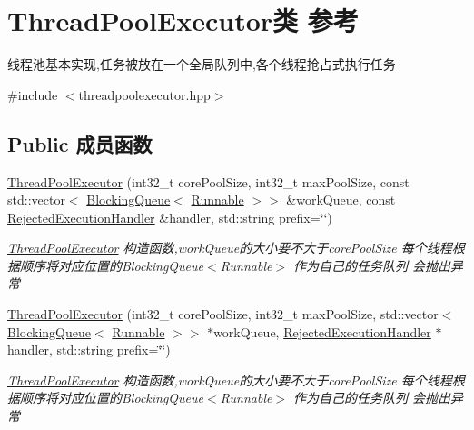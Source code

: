 \hypertarget{classThreadPoolExecutor}{}\section{Thread\+Pool\+Executor类 参考}
\label{classThreadPoolExecutor}


线程池基本实现,任务被放在一个全局队列中,各个线程抢占式执行任务  




{\ttfamily \#include $<$threadpoolexecutor.\+hpp$>$}

\subsection*{Public 成员函数}
\begin{DoxyCompactItemize}
\item 
\hyperlink{classThreadPoolExecutor_a23c3df3798fd2141637fc57b7de601d0}{Thread\+Pool\+Executor} (int32\+\_\+t core\+Pool\+Size, int32\+\_\+t max\+Pool\+Size, const std\+::vector$<$ \hyperlink{classBlockingQueue}{Blocking\+Queue}$<$ \hyperlink{classRunnable}{Runnable} $>$$>$ \&work\+Queue, const \hyperlink{classRejectedExecutionHandler}{Rejected\+Execution\+Handler} \&handler, std\+::string prefix=\char`\"{}\char`\"{})
\begin{DoxyCompactList}\small\item\em \hyperlink{classThreadPoolExecutor}{Thread\+Pool\+Executor} 构造函数,work\+Queue的大小要不大于core\+Pool\+Size 每个线程根据顺序将对应位置的\+Blocking\+Queue$<$\+Runnable$>$ 作为自己的任务队列 会抛出异常 \end{DoxyCompactList}\item 
\hyperlink{classThreadPoolExecutor_afe143198e44e4d896b0ada2307514d67}{Thread\+Pool\+Executor} (int32\+\_\+t core\+Pool\+Size, int32\+\_\+t max\+Pool\+Size, std\+::vector$<$ \hyperlink{classBlockingQueue}{Blocking\+Queue}$<$ \hyperlink{classRunnable}{Runnable} $>$$>$ $\ast$work\+Queue, \hyperlink{classRejectedExecutionHandler}{Rejected\+Execution\+Handler} $\ast$handler, std\+::string prefix=\char`\"{}\char`\"{})
\begin{DoxyCompactList}\small\item\em \hyperlink{classThreadPoolExecutor}{Thread\+Pool\+Executor} 构造函数,work\+Queue的大小要不大于core\+Pool\+Size 每个线程根据顺序将对应位置的\+Blocking\+Queue$<$\+Runnable$>$ 作为自己的任务队列 会抛出异常 \end{DoxyCompactList}\item 

\end{DoxyCompactItemize}

